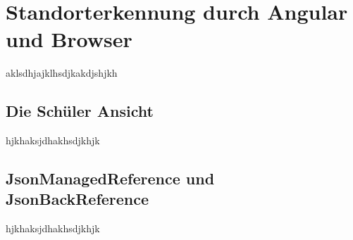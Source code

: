 \section{Standorterkennung durch Angular und Browser}
aklsdhjajklhsdjkakdjshjkh

\begin{spacing}{1}
\section{Die Schüler Ansicht}
\end{spacing}
hjkhaksjdhakhsdjkhjk

\begin{spacing}{1}
\section{JsonManagedReference und JsonBackReference}
\end{spacing}
hjkhaksjdhakhsdjkhjk
    
